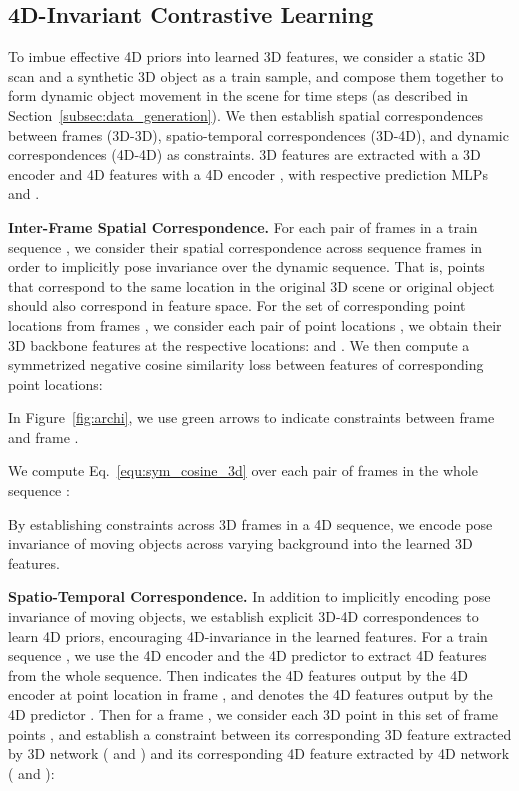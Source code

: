 \documentclass[runningheads]{llncs}
\begin{document}
\subsection{4D-Invariant Contrastive Learning}
\label{subsec:pretext_task}

To imbue effective 4D priors into learned 3D features, we consider a static 3D scan  and a synthetic 3D object  as a train sample, and compose them together to form dynamic object movement in the scene  for  time steps (as described in Section~\ref{subsec:data_generation}).
We then establish spatial correspondences between frames (3D-3D), spatio-temporal correspondences (3D-4D), and dynamic correspondences (4D-4D) as constraints.
3D features are extracted with a 3D encoder  and 4D features with a 4D encoder , with respective prediction MLPs  and . 


\noindent \textbf{Inter-Frame Spatial Correspondence.} 
For each pair of frames  in a train sequence , we consider their spatial correspondence across sequence frames in order to implicitly pose invariance over the dynamic sequence. 
That is, points that correspond to the same location in the original 3D scene  or original object  should also correspond in feature space.
For the set of corresponding point locations  from frames , we consider each pair of point locations , we obtain their 3D backbone features at the respective locations:  and .
We then compute a symmetrized negative cosine similarity loss between features of corresponding point locations:

In Figure~\ref{fig:archi}, we use \textcolor{green_fig}{green} arrows to indicate constraints between frame  and frame .

We compute Eq.~\ref{equ:sym_cosine_3d} over each pair of frames in the whole sequence :


By establishing constraints across 3D frames in a 4D sequence, we encode pose invariance of moving objects across varying background into the learned 3D features.

\noindent \textbf{Spatio-Temporal Correspondence.}
In addition to implicitly encoding pose invariance of moving objects, we establish explicit 3D-4D correspondences to learn 4D priors, encouraging 4D-invariance in the learned features.
For a train sequence , we use the 4D encoder  and the 4D predictor  to extract 4D features from the whole sequence. 
Then  indicates the 4D features output by the 4D encoder  at point location  in frame , and  denotes the 4D features output by the 4D predictor .  
Then for a frame , we consider each 3D point  in this set of frame points , and establish a constraint between its corresponding 3D feature extracted by 3D network ( and ) and its corresponding 4D feature extracted by 4D network ( and ):
\end{document}
